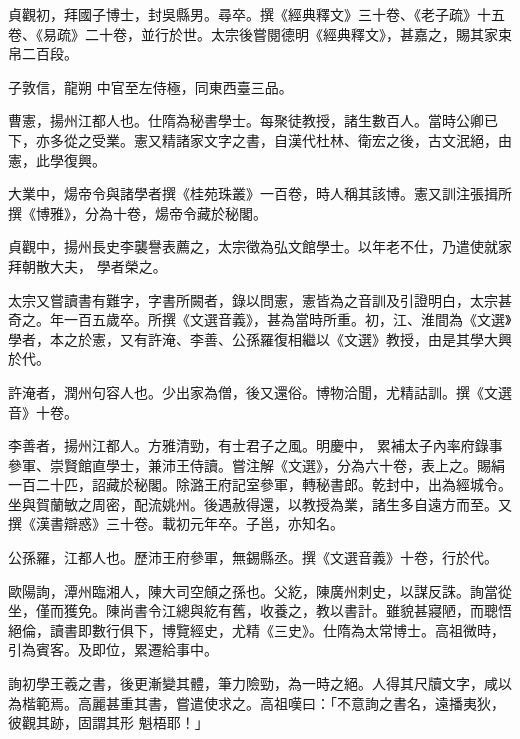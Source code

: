 \begin{pinyinscope}
 貞觀初，拜國子博士，封吳縣男。尋卒。撰《經典釋文》三十卷、《老子疏》十五卷、《易疏》二十卷，並行於世。太宗後嘗閱德明《經典釋文》，甚嘉之，賜其家束帛二百段。



 子敦信，龍朔
 中官至左侍極，同東西臺三品。



 曹憲，揚州江都人也。仕隋為秘書學士。每聚徒教授，諸生數百人。當時公卿已下，亦多從之受業。憲又精諸家文字之書，自漢代杜林、衛宏之後，古文泯絕，由憲，此學復興。



 大業中，煬帝令與諸學者撰《桂苑珠叢》一百卷，時人稱其該博。憲又訓注張揖所撰《博雅》，分為十卷，煬帝令藏於秘閣。



 貞觀中，揚州長史李襲譽表薦之，太宗徵為弘文館學士。以年老不仕，乃遣使就家拜朝散大夫，
 學者榮之。



 太宗又嘗讀書有難字，字書所闕者，錄以問憲，憲皆為之音訓及引證明白，太宗甚奇之。年一百五歲卒。所撰《文選音義》，甚為當時所重。初，江、淮間為《文選》學者，本之於憲，又有許淹、李善、公孫羅復相繼以《文選》教授，由是其學大興於代。



 許淹者，潤州句容人也。少出家為僧，後又還俗。博物洽聞，尤精詁訓。撰《文選音》十卷。



 李善者，揚州江都人。方雅清勁，有士君子之風。明慶中，
 累補太子內率府錄事參軍、崇賢館直學士，兼沛王侍讀。嘗注解《文選》，分為六十卷，表上之。賜絹一百二十匹，詔藏於秘閣。除潞王府記室參軍，轉秘書郎。乾封中，出為經城令。坐與賀蘭敏之周密，配流姚州。後遇赦得還，以教授為業，諸生多自遠方而至。又撰《漢書辯惑》三十卷。載初元年卒。子邕，亦知名。



 公孫羅，江都人也。歷沛王府參軍，無錫縣丞。撰《文選音義》十卷，行於代。



 歐陽詢，潭州臨湘人，陳大司空頠之孫也。父紇，陳廣州刺史，以謀反誅。詢當從坐，僅而獲免。陳尚書令江總與紇有舊，收養之，教以書計。雖貌甚寢陋，而聰悟絕倫，讀書即數行俱下，博覽經史，尤精《三史》。仕隋為太常博士。高祖微時，引為賓客。及即位，累遷給事中。



 詢初學王羲之書，後更漸變其體，筆力險勁，為一時之絕。人得其尺牘文字，咸以為楷範焉。高麗甚重其書，嘗遣使求之。高祖嘆曰：「不意詢之書名，遠播夷狄，彼觀其跡，固謂其形
 魁梧耶！」




\end{pinyinscope}
